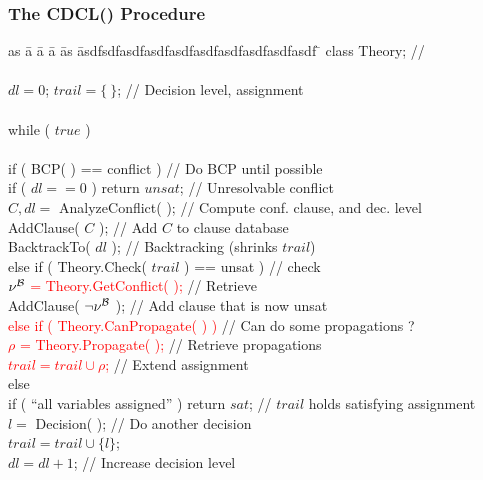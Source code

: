 \begin{frame}
  \frametitle{The CDCL(\T) Procedure}

  \scriptsize

  \vfill

  \begin{tabbing}
  as \= a \= a \= a \= as \= asdfsdfasdfasdfasdfasdfasdfasdfasdfasdf \= \kill
  \> class {\sc Theory};                         \> \> \> \> \> // \tsolver \\
  \\
  \> $dl = 0$; $trail = \{\ \}$;                                  \> \> \> \> \> // Decision level, assignment\\ \\
  \> while ( $true$ ) \\ \\
  \> \> if ( {\sc BCP}( ) == conflict )                                    \> \> \> \> // Do BCP until possible \\
  \> \> \> if ( $dl == 0$ ) return $unsat$;                             \> \> \> // Unresolvable conflict \\
  \> \> \> $C,dl =$ {\sc AnalyzeConflict}( );                           \> \> \> // Compute conf. clause, and dec. level \\
  \> \> \> {\sc AddClause}( $C$ );                                      \> \> \> // Add $C$ to clause database \\
  \> \> \> {\sc BacktrackTo}( $dl$ );                                   \> \> \> // Backtracking (shrinks $trail$) \\
  \> \> else if ( {\sc Theory.Check}( $trail$ ) == unsat )      \> \> \> \> // \tsolver check \\
  \> \> \> \textcolor{red}{$\nu^{\mathcal{B}}$ = {\sc Theory.GetConflict}( );}             \> \> \> // Retrieve \tconflict \\
  \> \> \> {\sc AddClause}( $\neg \nu^{\mathcal{B}}$ );                  \> \> \> // Add clause that is now unsat \\
  \> \> \textcolor{red}{else if ( {\sc Theory.CanPropagate}( ) )}        \> \> \> \> // Can do some propagations ? \\
  \> \> \> \textcolor{red}{$\rho$ = {\sc Theory.Propagate}( );}                      \> \> \> // Retrieve propagations \\
  \> \> \> \textcolor{red}{$trail = trail \cup \rho$;}                               \> \> \> // Extend assignment \\
  \> \> else \\
  \> \> \> if ( ``all variables assigned'' ) return $sat$;              \> \> \> // $trail$ holds satisfying assignment \\
  \> \> \> $l = $ {\sc Decision}( );                                    \> \> \> // Do another decision \\
  \> \> \> $trail = trail \cup \{ l \}$; \\                          
  \> \> \> $dl = dl + 1$;                                               \> \> \> // Increase decision level \\
  \end{tabbing}


\end{frame}
